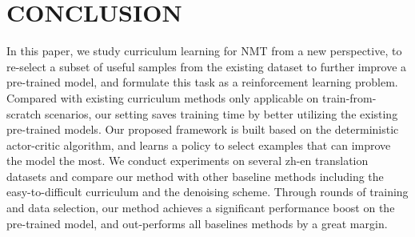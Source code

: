 \documentclass[letterpaper]{article}
\begin{document}
\section{CONCLUSION}
\label{sec:conclude}

In this paper, we study curriculum learning for NMT from a new perspective, to re-select a subset of useful samples from the existing dataset to further improve a pre-trained model, and formulate this task as a reinforcement learning problem. Compared with existing curriculum methods only applicable on train-from-scratch scenarios, our setting saves training time by better utilizing the existing pre-trained models. Our proposed framework is built based on the deterministic actor-critic algorithm, and learns a policy to select examples that can improve the model the most. 
We conduct experiments on several zh-en translation datasets and compare our method with other baseline methods including the easy-to-difficult curriculum and the denoising scheme. 
Through rounds of training and data selection, our method achieves a significant performance boost on the pre-trained model, and out-performs all baselines methods by a great margin. 

\fontsize{9.0pt}{10.0pt}\selectfont


\end{document}
